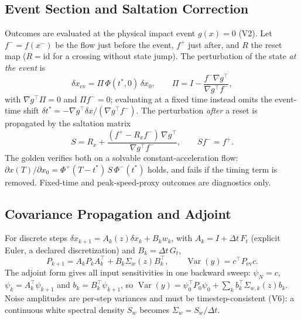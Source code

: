 \documentclass[11pt,a4paper]{article}
\begin{document}
\subsection{Event Section and Saltation Correction}
\label{sec:var-salt}

Outcomes are evaluated at the physical impact event $g(x)=0$ (V2).  Let
$f^-=f(x^-)$ be the flow just before the event, $f^+$ just after, and
$R$ the reset map ($R=\mathrm{id}$ for a crossing without state jump).  The
perturbation of the state \emph{at the event} is
\begin{equation}
\delta x_{\mathrm{ev}}=\Pi\,\Phi(t^*,0)\,\delta x_0,\qquad
\Pi=I-\frac{f^-\nabla g^{\!\top}}{\nabla g^{\!\top}f^-},
\end{equation}
with $\nabla g^{\!\top}\Pi=0$ and $\Pi f^-=0$; evaluating at a fixed time
instead omits the event-time shift $\delta t^*=-\nabla g^{\!\top}\delta x/
(\nabla g^{\!\top}f^-)$.  The perturbation \emph{after} a reset is propagated by
the saltation matrix
\begin{equation}
S=R_x+\frac{(f^+-R_xf^-)\,\nabla g^{\!\top}}{\nabla g^{\!\top}f^-},\qquad
S f^-=f^+ .
\end{equation}
The golden verifies both on a solvable constant-acceleration flow:
$\partial x(T)/\partial x_0=\Phi^+(T-t^*)\,S\,\Phi^-(t^*)$ holds, and fails if
the timing term is removed.  Fixed-time and peak-speed-proxy outcomes are
diagnostics only.

\subsection{Covariance Propagation and Adjoint}
\label{sec:var-cov}

For discrete steps $\delta x_{k+1}=A_k(z)\delta x_k+B_k w_k$, with
$A_k=I+\Delta t\,F_t$ (explicit Euler, a declared discretization) and
$B_k=\Delta t\,G_t$,
\begin{equation}
P_{k+1}=A_kP_kA_k^{\!\top}+B_k\Sigma_w(z)B_k^{\!\top},\qquad
\operatorname{Var}(y)=c^{\!\top}P_{\mathrm{ev}}c .
\end{equation}
The adjoint form gives all input sensitivities in one backward sweep:
$\psi_N=c$, $\psi_k=A_k^{\!\top}\psi_{k+1}$ and
$b_k=B_k^{\!\top}\psi_{k+1}$, so
$\operatorname{Var}(y)=\psi_0^{\!\top}P_0\psi_0+\sum_k b_k^{\!\top}\Sigma_{w,k}(z)b_k$.
Noise amplitudes are per-step variances and must be timestep-consistent (V6):
a continuous white spectral density $S_w$ becomes $\Sigma_w=S_w/\Delta t$.
\end{document}
